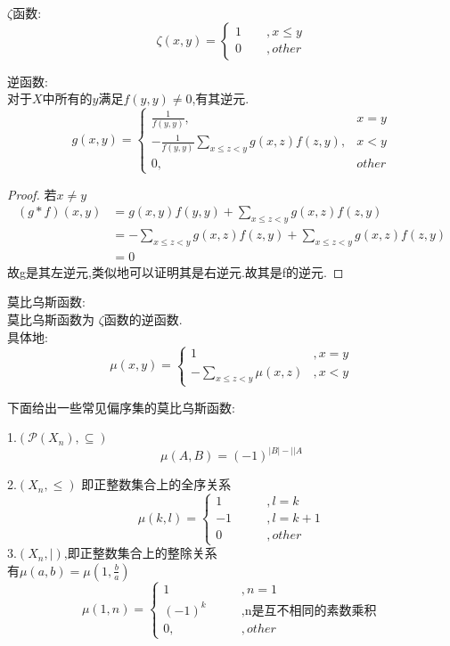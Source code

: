 \begin{definition}
$\zeta$函数:
$$
\zeta(x,y)=\begin{cases}1\qquad,x\leq y\\ 0\qquad,other\end{cases}
$$
\end{definition}


\begin{definition}
逆函数:\\
对于$X$中所有的$y$满足$f(y,y)\neq 0$,有其逆元.
$$
g(x,y)=\begin{cases}
  \frac{1}{f(y,y)} ,& x=y\\
  -\frac{1}{f(y,y)}\sum_{x\le z < y} g(x,z)f(z,y),&x< y\\
  0,&other
\end{cases}
$$
\end{definition}


\begin{proof}
  若$x\neq y$
  $$
  \begin{aligned}
  (g*f)(x,y)&=g(x,y)f(y,y)+\sum_{x \le z <y} g(x,z)f(z,y)\\
  &=-\sum_{x \le z <y} g(x,z)f(z,y)+\sum_{x \le z <y} g(x,z)f(z,y)\\
  &=0
  \end{aligned}
  $$
  故g是其左逆元,类似地可以证明其是右逆元.故其是f的逆元.
\end{proof}


\begin{definition}
  莫比乌斯函数:\\
  莫比乌斯函数为 $\zeta$函数的逆函数.\\
  具体地:
  $$
  \mu(x,y)=\begin{cases}
    1&,x=y\\
    -\sum_{x\leq z<y} \mu(x,z)& ,x<y
    \end{cases}
  $$
\end{definition}


下面给出一些常见偏序集的莫比乌斯函数: 

1.$(\mathcal{P}(X_n),\subseteq)$ \\
\[
\mu(A,B)=(-1)^{|B|-||A}
\]

2.$(X_n,\le)$ 即正整数集合上的全序关系\\
\[
\mu(k,l)=\begin{cases}
  1&\qquad,l=k\\
  -1&\qquad,l=k+1\\
  0&\qquad,other
  \end{cases}
\]
3.$(X_n,|)$,即正整数集合上的整除关系\\
有$\mu(a,b)=\mu\left(1,\frac{b}{a}\right)$
\[
  \mu(1,n)=\begin{cases}
    1&\qquad,n=1\\
    (-1)^k&\qquad,\text{n是互不相同的素数乘积}\\
    0,&\qquad,other
    \end{cases}
\]

